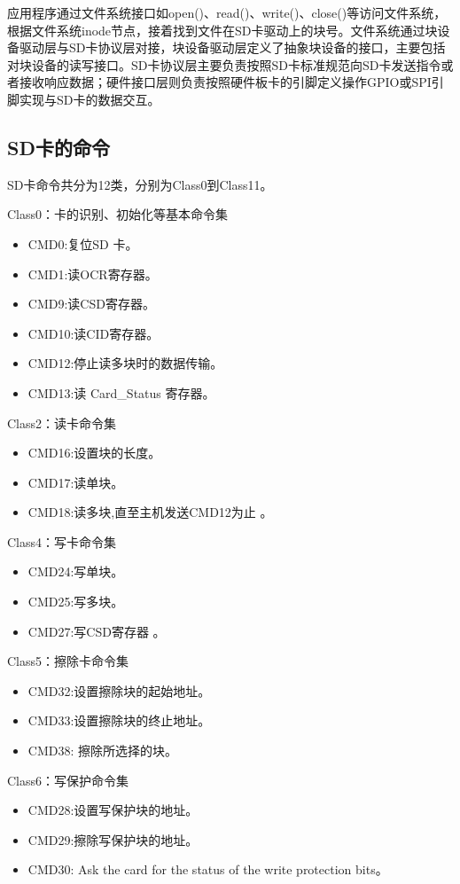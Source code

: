 应用程序通过文件系统接口如open()、read()、write()、close()等访问文件系统，根据文件系统inode节点，接着找到文件在SD卡驱动上的块号。文件系统通过块设备驱动层与SD卡协议层对接，块设备驱动层定义了抽象块设备的接口，主要包括对块设备的读写接口。SD卡协议层主要负责按照SD卡标准规范向SD卡发送指令或者接收响应数据；硬件接口层则负责按照硬件板卡的引脚定义操作GPIO或SPI引脚实现与SD卡的数据交互。

\subsection{SD卡的命令}
SD卡命令共分为12类，分别为Class0到Class11。


Class0：卡的识别、初始化等基本命令集
\begin{itemize}
	\item CMD0:复位SD 卡。
	\item CMD1:读OCR寄存器。
	\item CMD9:读CSD寄存器。
	\item CMD10:读CID寄存器。
	\item CMD12:停止读多块时的数据传输。
	\item CMD13:读 Card\_Status 寄存器。
\end{itemize}

Class2：读卡命令集
\begin{itemize}
	\item CMD16:设置块的长度。
	\item CMD17:读单块。
	\item CMD18:读多块,直至主机发送CMD12为止 。
\end{itemize}

Class4：写卡命令集
\begin{itemize}
	\item CMD24:写单块。
	\item CMD25:写多块。
	\item CMD27:写CSD寄存器 。
\end{itemize}

Class5：擦除卡命令集
\begin{itemize}
	\item CMD32:设置擦除块的起始地址。
	\item CMD33:设置擦除块的终止地址。
	\item CMD38: 擦除所选择的块。
\end{itemize}

Class6：写保护命令集
\begin{itemize}
	\item CMD28:设置写保护块的地址。
	\item CMD29:擦除写保护块的地址。
	\item CMD30: Ask the card for the status of the write protection bits。
\end{itemize}

